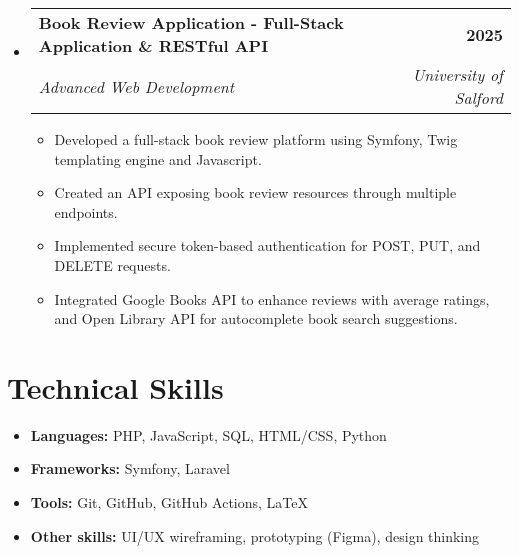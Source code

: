 \documentclass[a4paper,12pt]{article}
\makeatletter
\newcommand{\resumeSubHeadingListStart}{\begin{itemize}[leftmargin=0in, label={}]}
\newcommand{\resumeSubHeadingListEnd}{\end{itemize}}
\newcommand{\resumeSubheading}[4]{
  \item
    \begin{tabular*}{\textwidth}[t]{l@{\extracolsep{\fill}}r}
      \textbf{#1} & #2 \\
      \textit{#3} & \textit{#4} \\
    \end{tabular*}\vspace{-2pt}
}
\newcommand{\resumeItem}[1]{\item #1}
\newcommand{\resumeItemListStart}{\begin{itemize}[leftmargin=2em, label=\textbullet, itemsep=2pt]}
\newcommand{\resumeItemListEnd}{\end{itemize}}
\makeatother
\begin{document}
\pagebreak

\resumeSubHeadingListStart
    \resumeSubheading
    {Book Review Application - Full-Stack Application \& RESTful API}{\bfseries{2025}}
    {Advanced Web Development}{University of Salford}
        \resumeItemListStart
            \resumeItem{Developed a full-stack book review platform using Symfony, Twig templating engine and Javascript.}
            \resumeItem{Created an API exposing book review resources through multiple endpoints.}
            \resumeItem{Implemented secure token-based authentication for POST, PUT, and DELETE requests.}
            \resumeItem{Integrated Google Books API to enhance reviews with average ratings, and Open Library API for autocomplete book search suggestions.}
        \resumeItemListEnd
\resumeSubHeadingListEnd

\section{Technical Skills}
\resumeItemListStart
    \resumeItem{\textbf{Languages:} PHP, JavaScript, SQL, HTML/CSS, Python}
    \resumeItem{\textbf{Frameworks:} Symfony, Laravel}
    \resumeItem{\textbf{Tools:} Git, GitHub, GitHub Actions, \LaTeX}
    \resumeItem{\textbf{Other skills:} UI/UX wireframing, prototyping (Figma), design thinking}
\resumeItemListEnd

\vfill
\end{document}
